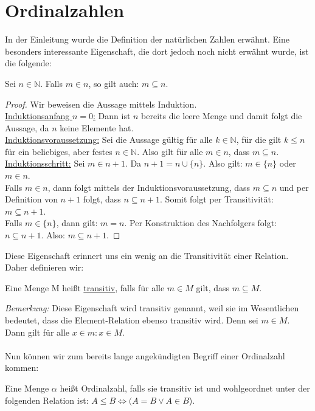 \documentclass[11pt]{scrartcl}
\newcommand{\N}{\mathbb{N}}
\begin{document}
\section{Ordinalzahlen}
In der Einleitung wurde die Definition der natürlichen Zahlen erwähnt. Eine besonders interessante Eigenschaft, die dort jedoch noch nicht erwähnt wurde, ist die folgende: 
\begin{lemma}
	Sei $n\in\N$. Falls $m\in n$, so gilt auch: $m \subseteq n$.
\end{lemma}
\begin{proof}
Wir beweisen die Aussage mittels Induktion. \\
\underline{Induktionsanfang $n=0$:} Dann ist $n$ bereits die leere Menge und damit folgt die Aussage, da $n$ keine Elemente hat. \\
\underline{Induktionsvoraussetzung:} Sei die Aussage gültig für alle $k\in\N$, für die gilt $k\leq n$ für ein beliebiges, aber festes $n\in\N$. Also gilt für alle $m \in n$, dass $m \subseteq n$. \\
\underline{Induktionsschritt:} Sei $m\in n+1$. Da $n+1= n \cup \{ n \}$. Also gilt: $m\in \{ n\}$ oder $m\in n$.\\ Falls $m\in n$, dann folgt mittels der Induktionsvoraussetzung, dass $m \subseteq n$ und per Definition von $n+1$ folgt, dass $n \subseteq n+1$. Somit folgt per Transitivität: $m \subseteq n+1$. \\
Falls $m\in \{ n\}$, dann gilt: $m=n$. Per Konstruktion des Nachfolgers folgt: $ n \subseteq n+1$. Also: $m \subseteq n+1$.
\end{proof}
Diese Eigenschaft erinnert uns ein wenig an die Transitivität einer Relation. Daher definieren wir:
\begin{definition}
	Eine Menge M heißt \underline{transitiv}, falls für alle $m\in M$ gilt, dass $m\subseteq M$.
\end{definition}
\noindent\textit{Bemerkung:} Diese Eigenschaft wird transitiv genannt, weil sie im Wesentlichen bedeutet, dass die Element-Relation ebenso transitiv wird. Denn sei $m\in M$. Dann gilt für alle $x\in m: x\in M$.\\\phantom{Test}\\ Nun können wir zum bereits lange angekündigten Begriff einer Ordinalzahl kommen:
\begin{definition}
	Eine Menge $\alpha$ heißt Ordinalzahl, falls sie transitiv ist und wohlgeordnet unter der folgenden Relation ist: $A \leq B \iff (A = B \lor A \in B$).
\end{definition}
\end{document}
